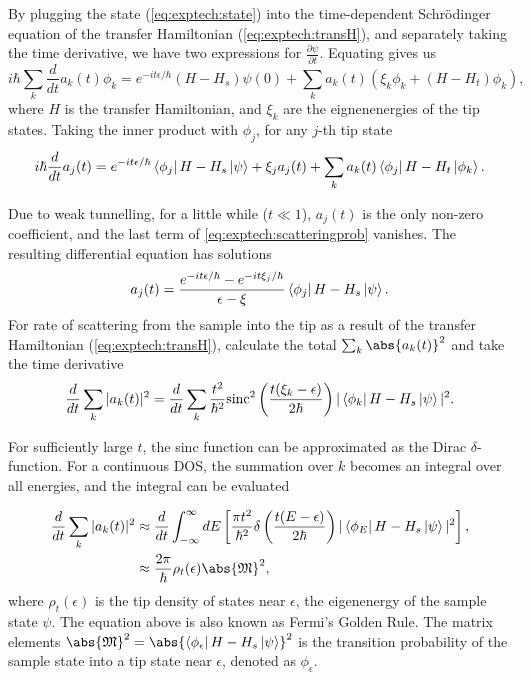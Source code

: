 By plugging the state (\autoref{eq:exptech:state}) into the time-dependent Schr\"odinger equation of the transfer Hamiltonian (\autoref{eq:exptech:transH}), and separately taking the time derivative, we have two expressions for $\frac{\partial \psi}{\partial t}$. Equating gives us
\begin{equation}
i\hbar \sum_k \frac{d}{dt} a_k(t) \phi_k = e^{-it\epsilon / \hbar} (H-H_{s})\psi(0) + \sum_k a_k(t) (\xi_k \phi_k + (H-H_{t})\phi_k),
\end{equation}
where $H$ is the transfer Hamiltonian, and $\xi_k$ are the eignenenergies of the tip states. Taking the inner product with $\phi_j$, for any $j$-th tip state
\begin{equation} \label{eq:exptech:scatteringprob}
i\hbar \frac{d}{dt} a_j(t) = e^{-it\epsilon/\hbar} \Bra{\phi_j}H-H_{s} \Ket{\psi} + \xi_j a_j(t) + \sum_k a_k(t) \Bra{\phi_j} H - H_{t} \Ket{\phi_k}.
\end{equation}

Due to weak tunnelling, for a little while ($t \ll 1$), $a_j(t)$ is the only non-zero coefficient, and the last term of \autoref{eq:exptech:scatteringprob} vanishes. The resulting differential equation has solutions
\begin{equation}
a_j(t) =  \frac{e^{-it\epsilon/\hbar} - e^{-it\xi_j/\hbar}}{\epsilon - \xi}  \Bra{\phi_j} H-H_{s} \Ket{\psi}.
\end{equation}
For rate of scattering from the sample into the tip as a result of the transfer Hamiltonian (\autoref{eq:exptech:transH}), calculate the total $\sum_k \abs{a_k(t)}^2$ and take the time derivative
\begin{equation}
\frac{d}{dt}\sum_k |a_k(t)|^2 = \frac{d}{dt}  \sum_k \frac{t^2}{\hbar^2}\textrm{sinc}^2 \left(\frac{t(\xi_k - \epsilon)}{2\hbar} \right) | \Bra{\phi_k} H-H_{s} \Ket{\psi}  | ^2.
\end{equation}

For sufficiently large $t$, the sinc function can be approximated as the Dirac $\delta$-function. For a continuous \ac{DOS}, the summation over $k$ becomes an integral over all energies, and the integral can be evaluated

\begin{align}
\frac{d}{dt}\sum_k |a_k(t)|^2 &\approx  \frac{d}{dt}  \int_{-\infty}^\infty dE \left[ \frac{\pi t^2}{\hbar^2} \delta \left(\frac{t(E - \epsilon)}{2\hbar} \right) | \Bra{\phi_E} H-H_{s} \Ket{\psi}  | ^2 \right], \\
&\approx  \frac{2\pi }{\hbar} \rho_t(\epsilon) \abs{\mathfrak{M}}^2,
\end{align}
where $\rho_t(\epsilon)$ is the tip density of states near $\epsilon$, the eigenenergy of the sample state $\psi$. The equation above is also known as Fermi's Golden Rule. The matrix elements $\abs{\mathfrak{M}}^2 = \abs{\Bra{\phi_\epsilon} H - H_s \Ket{\psi}}^2$ is the transition probability of the sample state into a tip state near $\epsilon$, denoted as $\phi_\epsilon$.

